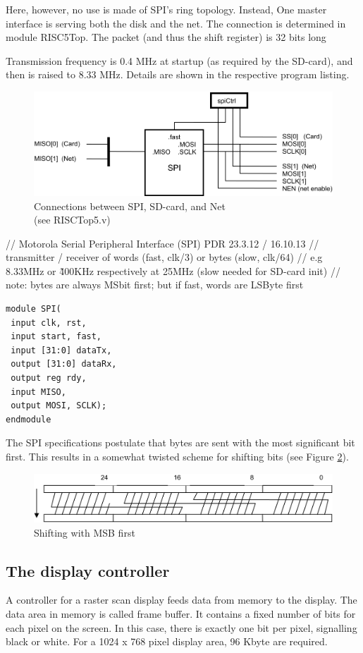 Here, however, no use is made of SPI's ring topology. Instead, One master interface is serving both the disk
and the net. The connection is determined in module RISC5Top. The packet (and thus the shift register)
is 32 bits long

Transmission frequency is 0.4 MHz at startup (as required by the SD-card), and then is raised to
8.33 MHz. Details are shown in the respective program listing.
\begin{figure}[h!]
  \centering
  \includegraphics[width=\textwidth]{i/G/7.png}
  \caption{Connections between SPI, SD-card, and Net\\(see RISCTop5.v)}
  \label{fig:spi}
\end{figure}

// Motorola Serial Peripheral Interface (SPI) PDR 23.3.12 / 16.10.13
// transmitter / receiver of words (fast, clk/3) or bytes (slow, clk/64)
// e.g 8.33MHz or \~400KHz respectively at 25MHz (slow needed for SD-card init)
// note: bytes are always MSbit first; but if fast, words are LSByte first
\begin{verbatim}
module SPI(
 input clk, rst,
 input start, fast,
 input [31:0] dataTx,
 output [31:0] dataRx,
 output reg rdy,
 input MISO,
 output MOSI, SCLK);
endmodule
\end{verbatim}

The SPI specifications postulate that bytes are sent with the most significant bit first. This results in
a somewhat twisted scheme for shifting bits (see Figure \ref{fig:msb}).
\begin{figure}[h!]
  \centering
  \includegraphics[width=\textwidth]{i/G/8.png}
  \caption{Shifting with MSB first}
  \label{fig:msb}
\end{figure}

\subsection{The display controller}
\label{sub:dispctrl}
A controller for a raster scan display feeds data from memory to the display. The data area in
memory is called frame buffer. It contains a fixed number of bits for each pixel on the screen. In this
case, there is exactly one bit per pixel, signalling black or white. For a 1024 x 768 pixel display
area, 96 Kbyte are required.

